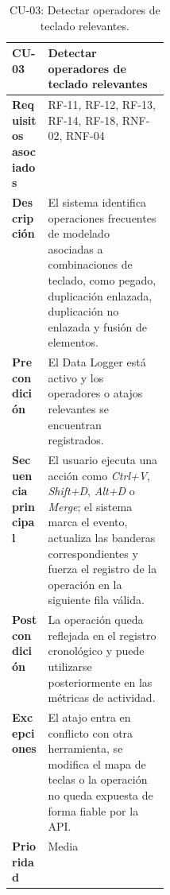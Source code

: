 \begin{table}[H]
\centering
\scriptsize
\begin{tabularx}{\linewidth}{p{0.23\linewidth}X}
\toprule
\textbf{CU-03} & Detectar operadores de teclado relevantes \\
\midrule
\textbf{Requisitos asociados} & RF-11, RF-12, RF-13, RF-14, RF-18, RNF-02, RNF-04 \\
\textbf{Descripción} & El sistema identifica operaciones frecuentes de modelado asociadas a combinaciones de teclado, como pegado, duplicación enlazada, duplicación no enlazada y fusión de elementos. \\
\textbf{Precondición} & El Data Logger está activo y los operadores o atajos relevantes se encuentran registrados. \\
\textbf{Secuencia principal} & El usuario ejecuta una acción como \textit{Ctrl+V}, \textit{Shift+D}, \textit{Alt+D} o \textit{Merge}; el sistema marca el evento, actualiza las banderas correspondientes y fuerza el registro de la operación en la siguiente fila válida. \\
\textbf{Postcondición} & La operación queda reflejada en el registro cronológico y puede utilizarse posteriormente en las métricas de actividad. \\
\textbf{Excepciones} & El atajo entra en conflicto con otra herramienta, se modifica el mapa de teclas o la operación no queda expuesta de forma fiable por la API. \\
\textbf{Prioridad} & Media \\
\bottomrule
\end{tabularx}
\caption{CU-03: Detectar operadores de teclado relevantes.}
\label{tab:cu3}
\end{table}

